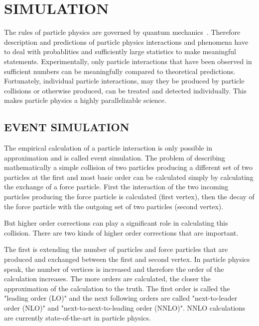 \documentclass{wscpaperproc}
\theoremstyle{wsc}
\begin{document}
\section{SIMULATION}
\label{sec:simulation}

The rules of particle physics are governed by quantum mechanics~. Therefore description and predictions of particle physics interactions and phenomena have to deal with probablities and sufficiently large statistics to make meaningful statements. Experimentally, only particle interactions that have been observed in sufficient numbers can be meaningfully compared to theoretical predictions. Fortunately, individual particle interactions, may they be produced by particle collisions or otherwise produced, can be treated and detected individually. This makes particle physics a highly parallelizable science.

\subsection{EVENT SIMULATION} 
\label{subsec:eventsimulation}

The empirical calculation of a particle interaction is only possible in approximation and is called event simulation. The problem of describing mathematically a simple collision of two particles producing a different set of two particles at the first and most basic order can be calculated simply by calculating the exchange of a force particle. First the interaction of the two incoming particles producing the force particle is calculated (first vertex), then the decay of the force particle with the outgoing set of two particles (second vertex).

But higher order corrections can play a significant role in calculating this collision. There are two kinds of higher order corrections that are important. 

The first is extending the number of particles and force particles that are produced and exchanged between the first and second vertex. In particle physics speak, the number of vertices is increased and therefore the order of the calculation increases. The more orders are calculated, the closer the approximation of the calculation to the truth. The first order is called the "leading order (LO)" and the next following orders are called "next-to-leader order (NLO)" and "next-to-next-to-leading order (NNLO)". NNLO calculations are currently state-of-the-art in particle physics.
\end{document}
